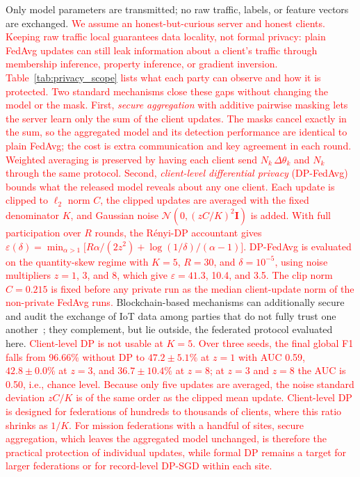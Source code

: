 \documentclass[conference]{IEEEtran}
\begin{document}
Only model parameters are transmitted; no raw traffic, labels,
or feature vectors are exchanged. \textcolor{red}{We assume
an honest-but-curious server and honest clients. Keeping raw traffic
local guarantees data locality, not formal privacy: plain FedAvg
updates can still leak information about a client's traffic through
membership inference, property inference, or gradient inversion.
Table~\ref{tab:privacy_scope} lists what each party can observe and
how it is protected. Two standard mechanisms close these gaps without
changing the model or the mask. First, \textit{secure aggregation}
with additive pairwise masking lets the server learn only the sum of
the client updates. The masks cancel exactly in the sum, so the
aggregated model and its detection performance are identical to plain
FedAvg; the cost is extra communication and key agreement in each
round. Weighted averaging is preserved by having each client send
$N_k\,\Delta\theta_k$ and $N_k$ through the same protocol. Second,
\textit{client-level differential privacy} (DP-FedAvg) bounds what
the released model reveals about any one client. Each update is
clipped to $\ell_2$ norm $C$, the clipped updates are averaged with
the fixed denominator $K$, and Gaussian noise
$\mathcal{N}(0,(zC/K)^2\mathbf{I})$ is added. With full participation
over $R$ rounds, the R\'enyi-DP accountant gives
$\varepsilon(\delta)=\min_{\alpha>1}\bigl[R\alpha/(2z^2)+
\log(1/\delta)/(\alpha-1)\bigr]$. DP-FedAvg is evaluated on the
quantity-skew regime with $K=5$, $R=30$, and $\delta=10^{-5}$, using
noise multipliers $z=1$, 3, and 8, which give $\varepsilon=41.3$,
10.4, and 3.5. The clip norm $C=0.215$ is fixed before any private
run as the median client-update norm of the non-private FedAvg runs.}
Blockchain-based mechanisms can additionally secure and audit the
exchange of IoT data among parties that do not fully trust one
another~\cite{amadi2026symmetric}; they complement, but lie outside,
the federated protocol evaluated here.
\textcolor{red}{Client-level DP is not usable at $K=5$. Over
three seeds, the final global F1 falls from 96.66\% without DP to
$47.2\pm5.1\%$ at $z=1$ with AUC 0.59, $42.8\pm0.0\%$ at $z=3$, and
$36.7\pm10.4\%$ at $z=8$; at $z=3$ and $z=8$ the AUC is 0.50, i.e.,
chance level. Because only five updates are averaged, the noise
standard deviation $zC/K$ is of the same order as the clipped mean
update. Client-level DP is designed for federations of hundreds to
thousands of clients, where this ratio shrinks as $1/K$. For mission
federations with a handful of sites, secure aggregation, which leaves
the aggregated model unchanged, is therefore the practical protection
of individual updates, while formal DP remains a target for larger
federations or for record-level DP-SGD within each site.}
\end{document}
